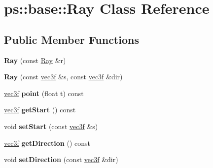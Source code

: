 \hypertarget{classps_1_1base_1_1Ray}{}\section{ps\+:\+:base\+:\+:Ray Class Reference}
\label{classps_1_1base_1_1Ray}
\subsection*{Public Member Functions}
\begin{DoxyCompactItemize}
\item 
\hypertarget{classps_1_1base_1_1Ray_a3f4defd9a8102fb4462e892a08093714}{}{\bfseries Ray} (const \hyperlink{classps_1_1base_1_1Ray}{Ray} \&r)\label{classps_1_1base_1_1Ray_a3f4defd9a8102fb4462e892a08093714}

\item 
\hypertarget{classps_1_1base_1_1Ray_a4598e4c733be5c6dcf4fd3baf9a0fcd2}{}{\bfseries Ray} (const \hyperlink{classps_1_1base_1_1Vec3}{vec3f} \&s, const \hyperlink{classps_1_1base_1_1Vec3}{vec3f} \&dir)\label{classps_1_1base_1_1Ray_a4598e4c733be5c6dcf4fd3baf9a0fcd2}

\item 
\hypertarget{classps_1_1base_1_1Ray_af9ea081576e075effebd1689b6af1d68}{}\hyperlink{classps_1_1base_1_1Vec3}{vec3f} {\bfseries point} (float t) const \label{classps_1_1base_1_1Ray_af9ea081576e075effebd1689b6af1d68}

\item 
\hypertarget{classps_1_1base_1_1Ray_acfb8ba6ee509c5750c5607e003eefeaf}{}\hyperlink{classps_1_1base_1_1Vec3}{vec3f} {\bfseries get\+Start} () const \label{classps_1_1base_1_1Ray_acfb8ba6ee509c5750c5607e003eefeaf}

\item 
\hypertarget{classps_1_1base_1_1Ray_ac110051b114825d2f3a283ced87c888b}{}void {\bfseries set\+Start} (const \hyperlink{classps_1_1base_1_1Vec3}{vec3f} \&s)\label{classps_1_1base_1_1Ray_ac110051b114825d2f3a283ced87c888b}

\item 
\hypertarget{classps_1_1base_1_1Ray_ab4eef4b56725a2f0daa1eb05788b0905}{}\hyperlink{classps_1_1base_1_1Vec3}{vec3f} {\bfseries get\+Direction} () const \label{classps_1_1base_1_1Ray_ab4eef4b56725a2f0daa1eb05788b0905}

\item 
\hypertarget{classps_1_1base_1_1Ray_a4b965ef1653bd7af1556e9299ccfe7f8}{}void {\bfseries set\+Direction} (const \hyperlink{classps_1_1base_1_1Vec3}{vec3f} \&dir)\label{classps_1_1base_1_1Ray_a4b965ef1653bd7af1556e9299ccfe7f8}


\end{DoxyCompactItemize}
